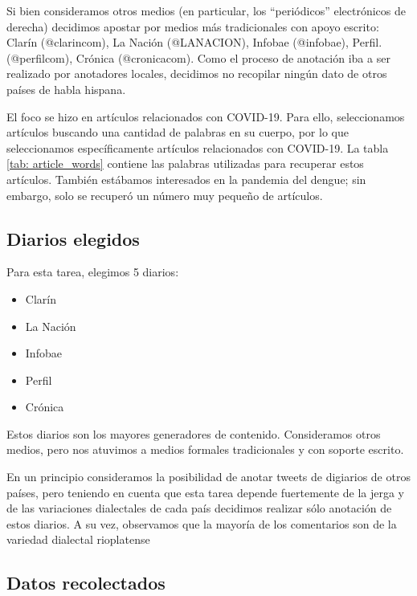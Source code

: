 Si bien consideramos otros medios (en particular, los ``periódicos'' electrónicos de derecha) decidimos apostar por medios más tradicionales con apoyo escrito: Clarín (@clarincom), La Nación (@LANACION), Infobae (@infobae), Perfil. (@perfilcom), Crónica (@cronicacom). Como el proceso de anotación iba a ser realizado por anotadores locales, decidimos no recopilar ningún dato de otros países de habla hispana.


El foco se hizo en artículos relacionados con COVID-19. Para ello, seleccionamos artículos buscando una cantidad de palabras en su cuerpo, por lo que seleccionamos específicamente artículos relacionados con COVID-19. La tabla \ref{tab: article_words} contiene las palabras utilizadas para recuperar estos artículos. También estábamos interesados en la pandemia del dengue; sin embargo, solo se recuperó un número muy pequeño de artículos.


\subsection{Diarios elegidos}

Para esta tarea, elegimos 5 diarios:

\begin{itemize}
    \item Clarín
    \item La Nación
    \item Infobae
    \item Perfil
    \item Crónica
\end{itemize}

Estos diarios son los mayores generadores de contenido. Consideramos otros medios, pero nos atuvimos a medios formales tradicionales y con soporte escrito.

En un principio consideramos la posibilidad de anotar tweets de digiarios de otros países, pero teniendo en cuenta que esta tarea depende fuertemente de la jerga y de las variaciones dialectales de cada país decidimos realizar sólo anotación de estos diarios. A su vez, observamos que la mayoría de los comentarios son de la variedad dialectal rioplatense


\subsection{Datos recolectados}

